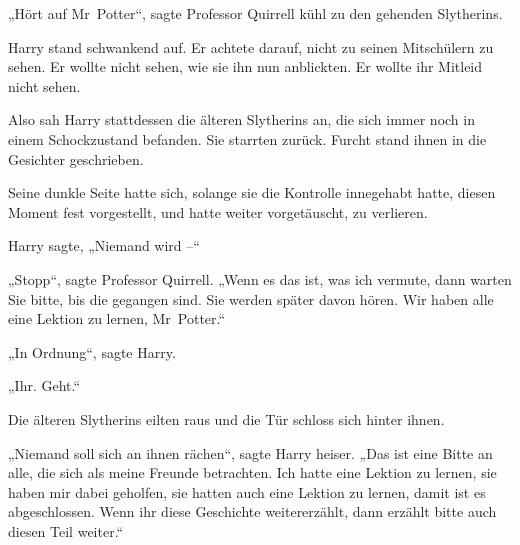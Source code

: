 „Hört auf Mr~Potter“, sagte Professor Quirrell kühl zu den gehenden Slytherins.

Harry stand schwankend auf. Er achtete darauf, nicht zu seinen Mitschülern zu sehen. Er wollte nicht sehen, wie sie ihn nun anblickten. Er wollte ihr Mitleid nicht sehen.

Also sah Harry stattdessen die älteren Slytherins an, die sich immer noch in einem Schockzustand befanden. Sie starrten zurück. Furcht stand ihnen in die Gesichter geschrieben.

Seine dunkle Seite hatte sich, solange sie die Kontrolle innegehabt hatte, diesen Moment fest vorgestellt, und hatte weiter vorgetäuscht, zu verlieren.

Harry sagte, „Niemand wird –“

„Stopp“, sagte Professor Quirrell. „Wenn es das ist, was ich vermute, dann warten Sie bitte, bis die gegangen sind. Sie werden später davon hören. Wir haben alle eine Lektion zu lernen, Mr~Potter.“

„In Ordnung“, sagte Harry.

„Ihr. Geht.“

Die älteren Slytherins eilten raus und die Tür schloss sich hinter ihnen.

„Niemand soll sich an ihnen rächen“, sagte Harry heiser. „Das ist eine Bitte an alle, die sich als meine Freunde betrachten. Ich hatte eine Lektion zu lernen, sie haben mir dabei geholfen, sie hatten auch eine Lektion zu lernen, damit ist es abgeschlossen. Wenn ihr diese Geschichte weitererzählt, dann erzählt bitte auch diesen Teil weiter.“

